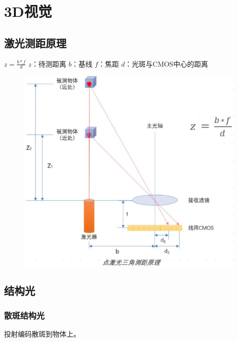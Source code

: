 \documentclass[11pt]{article}
\begin{document}
\section{3D视觉}

\subsection{激光测距原理}
$z=\frac{b*f}{d}$  \qquad  $z$：待测距离 \quad $b$：基线 \quad $f$：焦距 \quad $d$：光斑与CMOS中心的距离
\begin{figure}[htb]
    \centering
    \includegraphics[scale=0.15]{imgs/zbfa.png}
\end{figure}

\subsection{结构光}

\subsubsection{散斑结构光}
投射编码散斑到物体上。
\end{document}
